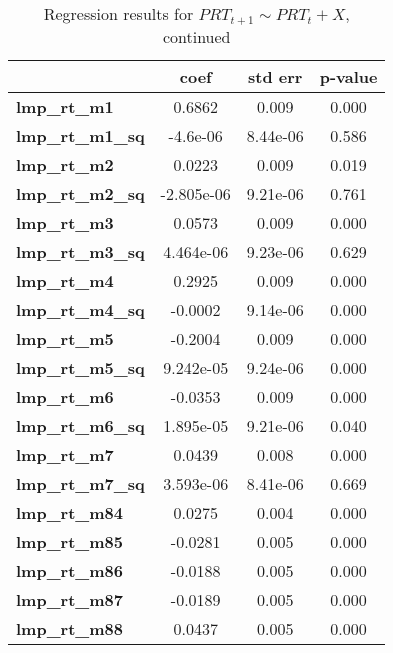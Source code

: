 \documentclass[conference]{IEEEtran}
\begin{document}
\begin{table}[htbp]
    \caption{\label{tab:ts2} Regression results for $PRT_{t+1} \sim PRT_t + X$, continued}
    \begin{center}
        \begin{tabular}{lccc}
            & \textbf{coef} & \textbf{std err} & \textbf{p-value} \\
\midrule
\textbf{lmp\_rt\_m1}              &       0.6862  &        0.009     & 0.000  \\
\textbf{lmp\_rt\_m1\_sq}          &     -4.6e-06  &     8.44e-06     & 0.586  \\
\textbf{lmp\_rt\_m2}              &       0.0223  &        0.009     & 0.019  \\
\textbf{lmp\_rt\_m2\_sq}          &   -2.805e-06  &     9.21e-06     & 0.761  \\
\textbf{lmp\_rt\_m3}              &       0.0573  &        0.009     & 0.000  \\
\textbf{lmp\_rt\_m3\_sq}          &    4.464e-06  &     9.23e-06     & 0.629  \\
\textbf{lmp\_rt\_m4}              &       0.2925  &        0.009     & 0.000  \\
\textbf{lmp\_rt\_m4\_sq}          &      -0.0002  &     9.14e-06     & 0.000  \\
\textbf{lmp\_rt\_m5}              &      -0.2004  &        0.009     & 0.000  \\
\textbf{lmp\_rt\_m5\_sq}          &    9.242e-05  &     9.24e-06     & 0.000  \\
\textbf{lmp\_rt\_m6}              &      -0.0353  &        0.009     & 0.000  \\
\textbf{lmp\_rt\_m6\_sq}          &    1.895e-05  &     9.21e-06     & 0.040  \\
\textbf{lmp\_rt\_m7}              &       0.0439  &        0.008     & 0.000  \\
\textbf{lmp\_rt\_m7\_sq}          &    3.593e-06  &     8.41e-06     & 0.669  \\
\textbf{lmp\_rt\_m84}             &       0.0275  &        0.004     & 0.000  \\
\textbf{lmp\_rt\_m85}             &      -0.0281  &        0.005     & 0.000  \\
\textbf{lmp\_rt\_m86}             &      -0.0188  &        0.005     & 0.000  \\
\textbf{lmp\_rt\_m87}             &      -0.0189  &        0.005     & 0.000  \\
\textbf{lmp\_rt\_m88}             &       0.0437  &        0.005     & 0.000  \\

\end{tabular}
\end{center}
\end{table}
\end{document}
